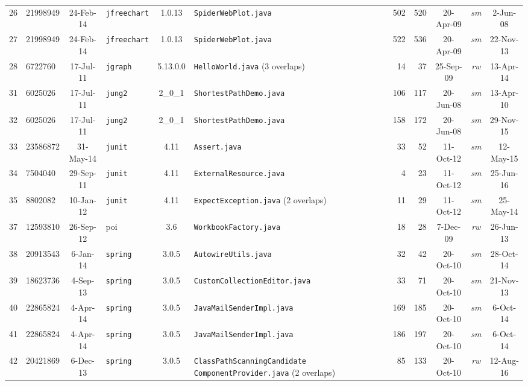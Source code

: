 \documentclass[sigconf,review, anonymous]{acmart}
\begin{document}
\begin{table}
{\begin{tabular}{r|l|c|l|c|p{5cm}|r|r|c|c|c}
			26 & 21998949 & 24-Feb-14 & \texttt{jfreechart} & 1.0.13 & \texttt{SpiderWebPlot.java}  & 502 & 520 & 20-Apr-09 & \textit{sm} & 2-Jun-08 \\
			27 & 21998949 & 24-Feb-14 & \texttt{jfreechart} & 1.0.13 & \texttt{SpiderWebPlot.java}  & 522 & 536 & 20-Apr-09 & \textit{sm} & 22-Nov-13 \\
			28 & 6722760 & 17-Jul-11 & \texttt{jgraph} & 5.13.0.0 & \texttt{HelloWorld.java} (3 overlaps)  & 14 & 37 & 25-Sep-09 & \textit{rw} & 13-Apr-14 \\
			31 & 6025026 & 17-Jul-11 & \texttt{jung2} & 2\_0\_1  & \texttt{ShortestPathDemo.java}  & 106 & 117 & 20-Jun-08 & \textit{sm} & 13-Apr-10 \\
			32 & 6025026 & 17-Jul-11 & \texttt{jung2} & 2\_0\_1  & \texttt{ShortestPathDemo.java}  & 158 & 172 & 20-Jun-08 & \textit{sm} & 29-Nov-15 \\
			33 & 23586872 & 31-May-14 & \texttt{junit} & 4.11 & \texttt{Assert.java} & 33 & 52 & 11-Oct-12 & \textit{sm} & 12-May-15 \\
			34 & 7504040 & 29-Sep-11 & \texttt{junit} & 4.11 & \texttt{ExternalResource.java}  & 4 & 23 & 11-Oct-12 & \textit{sm} & 25-Jun-16 \\
			35 & 8802082 & 10-Jan-12 & \texttt{junit} & 4.11 & \texttt{ExpectException.java} (2 overlaps) & 11 & 29 & 11-Oct-12 & \textit{sm} & 25-May-14 \\
			37 & 12593810 & 26-Sep-12 & poi & 3.6 & \texttt{WorkbookFactory.java}  & 18 & 28 & 7-Dec-09 & \textit{rw} & 26-Jun-13 \\
			38 & 20913543 & 6-Jan-14 & \texttt{spring} & 3.0.5  & \texttt{AutowireUtils.java} & 32 & 42 & 20-Oct-10 & \textit{sm} & 28-Oct-14 \\
			39 & 18623736 & 4-Sep-13 & \texttt{spring} & 3.0.5  & \texttt{CustomCollectionEditor.java}  & 33 & 71 & 20-Oct-10 & \textit{sm} & 21-Nov-13 \\
			40 & 22865824 & 4-Apr-14 & \texttt{spring} & 3.0.5  & \texttt{JavaMailSenderImpl.java} & 169 & 185 & 20-Oct-10 & \textit{sm} & 6-Oct-14 \\
			41 & 22865824 & 4-Apr-14 & \texttt{spring} & 3.0.5  & \texttt{JavaMailSenderImpl.java} & 186 & 197 & 20-Oct-10 & \textit{sm} & 6-Oct-14 \\
			42 & 20421869 & 6-Dec-13 & \texttt{spring} & 3.0.5  & \texttt{ClassPathScanningCandidate \newline ComponentProvider.java} (2 overlaps) & 85 & 133 & 20-Oct-10 & \textit{rw} & 12-Aug-16 \\

\end{tabular}}
\end{table}
\end{document}
